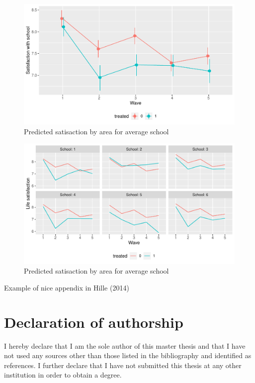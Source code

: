 \documentclass[a4, 12pt]{article}
\begin{document}
\begin{figure}[H]

{\centering \includegraphics[width=0.8\linewidth,]{../figures/sat_school_pred} 

}

\caption{Predicted satisaction by area for average school}\label{fig:sat-school-pred}
\end{figure}
\begin{figure}[H]

{\centering \includegraphics[width=0.8\linewidth,]{../figures/sat_school_pred_across_schools} 

}

\caption{Predicted satisaction by area for average school}\label{fig:sat-school-pred-across-schools}
\end{figure}

Example of nice appendix in Hille (2014)

\hypertarget{declaration-of-authorship}{%
\section*{Declaration of authorship}\label{declaration-of-authorship}}

I hereby declare that I am the sole author of this master thesis and that I have not used any sources other than those listed in the bibliography and identified as references. I further declare that I have not submitted this thesis at any other institution in order to obtain a degree.
\end{document}
